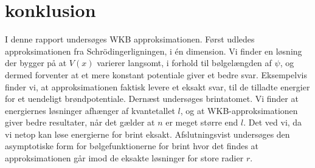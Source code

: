 \section{konklusion}
I denne rapport undersøges WKB approksimationen. Først udledes approksimationen fra Schrödingerligningen, i én dimension. Vi finder en løsning der bygger på at $V(x)$ varierer langsomt, i forhold til bølgelængden af $\psi$, og dermed forventer at et mere konstant potentiale giver et bedre svar. Eksempelvis finder vi, at approksimationen faktisk levere et eksakt svar, til de tilladte energier for et uendeligt brøndpotentiale. Dernæst undersøges brintatomet. Vi finder at energiernes løsninger afhænger af kvantetallet $l$, og at WKB-approksimationen giver bedre resultater, når det gælder at $n$ er meget større end $l$. Det ved vi, da vi netop kan løse energierne for brint eksakt. Afslutningsvist undersøges den asymptotiske form for bølgefunktionerne for brint hvor det findes at approksimationen går imod de eksakte løsninger for store radier $r$.
